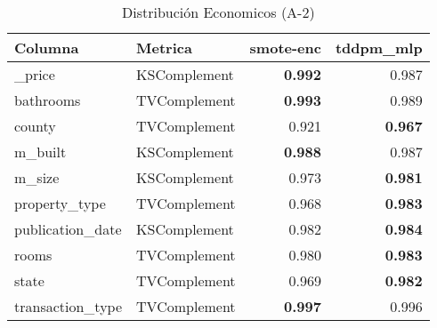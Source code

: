 \begin{table}[H]
\centering
\caption{Distribución Economicos (A-2)}
\label{table-shape-economicos-a-2}
\begin{tabular}{|l|l|r|r|}
\hline
\rowcolor[gray]{0.8}
Columna & Metrica & smote-enc & tddpm\_mlp \\
\hline \_price & KSComplement & \bfseries 0.992 & 0.987 \\
\hline bathrooms & TVComplement & \bfseries 0.993 & 0.989 \\
\hline county & TVComplement & 0.921 & \bfseries 0.967 \\
\hline m\_built & KSComplement & \bfseries 0.988 & 0.987 \\
\hline m\_size & KSComplement & 0.973 & \bfseries 0.981 \\
\hline property\_type & TVComplement & 0.968 & \bfseries 0.983 \\
\hline publication\_date & KSComplement & 0.982 & \bfseries 0.984 \\
\hline rooms & TVComplement & 0.980 & \bfseries 0.983 \\
\hline state & TVComplement & 0.969 & \bfseries 0.982 \\
\hline transaction\_type & TVComplement & \bfseries 0.997 & 0.996 \\
\hline
\end{tabular}
\end{table}
